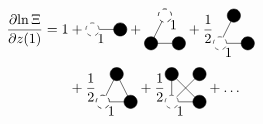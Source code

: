\documentclass[8.5pt,twoside,twocolumn]{article}
\theoremstyle{standard}
\begin{document}
\begin{equation}
\begin{aligned}
\deri{\ln\Xi}{z(1)}  =
1
&+
\begin{tikzpicture}[baseline=-.1cm]%
  \draw(0,0) node[circle,minimum size=.2cm,dashed,draw] (A) {};
  \draw(.7,0) node[circle,minimum size=.2cm,draw,fill=black] (B) {};
  \draw (A.east) --  (B.center);
  \node [below right] at (A) {1};
\end{tikzpicture}
+
\begin{tikzpicture}[baseline=.25cm]
  \draw(0,0) node[circle,minimum size=.2cm,draw,fill=black] (A) {};
  \draw(.7,0) node[circle,minimum size=.2cm,draw,fill=black] (B) {};
  \draw(.35,.7) node[circle,minimum size=.2cm,dashed,draw] (C) {};
  \draw (A.center) --  (B.west);
  \draw (A.center) --  (C.center);
  \draw node[circle,minimum size=.2cm,draw,fill=white,dashed,opacity=1] at (C) {};
  \node [below right] at (C) {1};
\end{tikzpicture}
+\frac 1 2
\begin{tikzpicture}[baseline=.25cm]
  \draw(.7,0) node[circle,minimum size=.2cm,draw,fill=black] (B) {};
  \draw(.35,.7) node[circle,minimum size=.2cm,draw,fill=black] (C) {};
  \draw (0,0) --  (B.center);
  \draw (0,0) --  (C.center);
  \draw(0,0) node[circle,minimum size=.2cm,draw,dashed,fill=white] (A) {};
  \node [below right] at (A) {1};
\end{tikzpicture}
\\&+ 
\frac 1 2
\begin{tikzpicture}[baseline=.25cm]
  \draw(0,0) node[circle,minimum size=.2cm,dashed,draw] (A) {};
  \draw(.7,0) node[circle,minimum size=.2cm,draw,fill=black] (B) {};
  \draw(.35,.7) node[circle,minimum size=.2cm,draw,fill=black] (C) {};
  \draw (A.center) --  (B.center);
  \draw (A.center) --  (C.center);
  \draw (B.center) --  (C.center);
  \draw node[circle,minimum size=.2cm,draw,dashed,fill=white,opacity=1] at (A) {};
  \node [below right] at (A) {1};
\end{tikzpicture}
 +
 \frac 1 2 
 \begin{tikzpicture}[baseline=.25cm]
  \draw(0,0) node[circle,minimum size=.2cm,dashed,draw] (A) {};
  \draw(.7,0) node[circle,minimum size=.2cm,draw,fill=black] (B) {};
  \draw(0,.7) node[circle,minimum size=.2cm,draw,fill=black] (C) {};
  \draw(.7,.7) node[circle,minimum size=.2cm,draw,fill=black] (D) {};
  \draw (A.east) --  (B.center);
  \draw (A.north) --  (C.center);
  \draw (B.center) --  (C.center);
  \draw (A.north east) --  (D.center);
  \node [below right] at (A) {1};
\end{tikzpicture}
+\ldots 
\end{aligned}
\end{equation}
\end{document}
